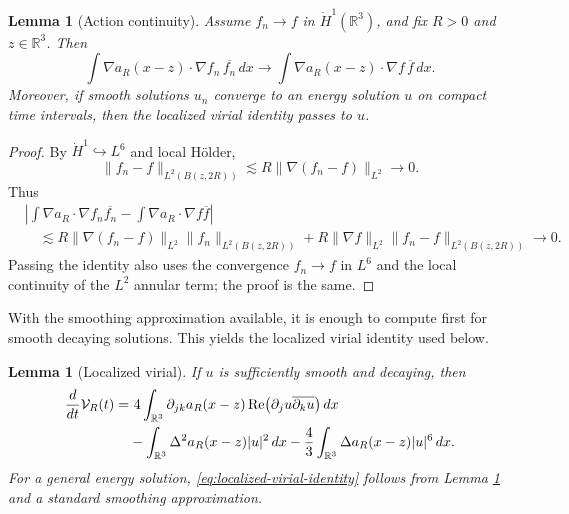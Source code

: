 \documentclass[10pt,a4paper]{amsart}
\numberwithin{equation}{section}
\newtheorem{lemma}[theorem]{Lemma}
\newcommand{\R}{\mathbb R}
\newcommand{\Vc}{\mathcal V}
\begin{document}
\begin{lemma}[Action continuity]\label{lem:virial-approximation}
Assume $f_n\to f$ in $\dot H^1(\R^3)$, and fix $R>0$ and $z\in\R^3$. Then
\[
  \int \nabla a_R(x-z)\cdot\nabla f_n\,\overline{f_n}\,dx
  \to
  \int \nabla a_R(x-z)\cdot\nabla f\,\overline f\,dx.
\]
Moreover, if smooth solutions $u_n$ converge to an energy solution $u$ on compact time intervals, then the localized virial identity passes to $u$.
\end{lemma}

\begin{proof}
By $\dot H^1\hookrightarrow L^6$ and local H\"older,
\[
  \|f_n-f\|_{L^2(B(z,2R))}
  \lesssim R\|\nabla(f_n-f)\|_{L^2}\to0.
\]
Thus
\[
\begin{aligned}
  &\left|\int \nabla a_R\cdot\nabla f_n\overline{f_n}
  -\int \nabla a_R\cdot\nabla f\overline f\right| \\
  &\quad\lesssim R\|\nabla(f_n-f)\|_{L^2}\|f_n\|_{L^2(B(z,2R))}
  +R\|\nabla f\|_{L^2}\|f_n-f\|_{L^2(B(z,2R))}\to0.
\end{aligned}
\]
Passing the identity also uses the convergence $f_n\to f$ in $L^6$ and the local continuity of the $L^2$ annular term; the proof is the same.
\end{proof}

With the smoothing approximation available, it is enough to compute first for smooth decaying solutions. This yields the localized virial identity used below.

\begin{lemma}[Localized virial]\label{lem:localized-virial}
If $u$ is sufficiently smooth and decaying, then
\begin{align}
  \frac{d}{dt}\Vc_R(t)
  =&\ 4\int_{\R^3}\partial_{jk}a_R(x-z)
  \operatorname{Re}\bigl(\partial_ju\overline{\partial_ku}\bigr)\,dx\notag\\
  &-\int_{\R^3}\Delta^2a_R(x-z)|u|^2\,dx
  -\frac43\int_{\R^3}\Delta a_R(x-z)|u|^6\,dx.
  \label{eq:localized-virial-identity}
\end{align}
For a general energy solution, \eqref{eq:localized-virial-identity} follows from Lemma \ref{lem:virial-approximation} and a standard smoothing approximation.
\end{lemma}
\end{document}

